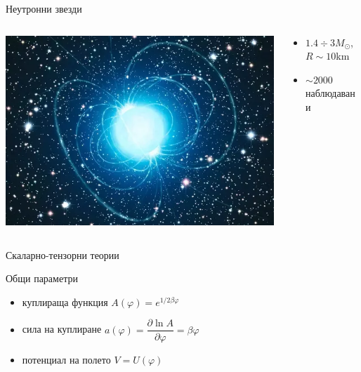 \documentclass[10pt,a4paper]{beamer}
\begin{document}
        \begin{frame}{ Неутронни звезди }
                \begin{columns}
                    \begin{column}{0.5\textwidth}
                        \includegraphics[width=\textwidth]{images/neutron_star.png}
                    \end{column}
                    \begin{column}{0.5\textwidth}
                        \begin{itemize}
                            \item $ 1.4 \div 3 M_{\odot} $, $ R \sim 10 $km
                            \item $ \sim 2000 $ наблюдавани
                        \end{itemize}
                    \end{column}
                \end{columns}
        \end{frame}
            
        \begin{frame}{ Скаларно-тензорни теории }
            \begin{block}{Общи параметри}
                \begin{itemize}
                    \item куплираща функция $ A(\varphi) = e^{1/2\beta \varphi}$
                    \item сила на куплиране $ a(\varphi) = \dfrac{\partial \ln A}{\partial \varphi} = \beta \varphi$
                    \item потенциал на полето $ V = U(\varphi) $
                \end{itemize}
            \end{block}
        \end{frame}
        
\end{document}
